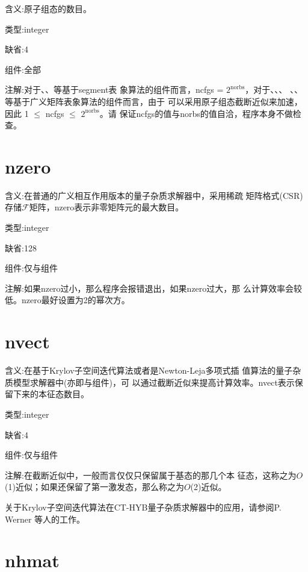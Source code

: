{\color{red}含义}:原子组态的数目。

{\color{green}类型}:integer

{\color{blue}缺省}:4

{\color{brown}组件}:全部

{\color{purple}注解}:对于{\azalea}、{\gardenia}、{\narcissus}等基于segment表
象算法的组件而言，ncfgs = $2^{\text{norbs}}$，对于{\begonia}、{\lavender}、{\camellia}、
{\epiphyllum}、{\pansy}、{\manjushaka}等基于广义矩阵表象算法的组件而言，由于
可以采用原子组态截断近似来加速，因此 1 $\leq$ ncfgs $\leq$  $2^{\text{norbs}}$。请
保证ncfgs的值与norbs的值自洽，程序本身不做检查。

\section{nzero }
\label{sec:nzero}

{\color{red}含义}:在普通的广义相互作用版本的量子杂质求解器中，采用稀疏
矩阵格式(CSR)存储$\mathcal{F}$矩阵，nzero表示非零矩阵元的最大数目。

{\color{green}类型}:integer

{\color{blue}缺省}:128

{\color{brown}组件}:仅{\begonia}与{\lavender}组件

{\color{purple}注解}:如果nzero过小，那么程序会报错退出，如果nzero过大，那
么计算效率会较低。nzero最好设置为2的幂次方。

\section{nvect }
\label{sec:nvect}

{\color{red}含义}:在基于Krylov子空间迭代算法或者是Newton-Leja多项式插
值算法的量子杂质模型求解器中(亦即{\camellia}与{\epiphyllum}组件)，可
以通过截断近似来提高计算效率。nvect表示保留下来的本征态数目。

{\color{green}类型}:integer

{\color{blue}缺省}:4

{\color{brown}组件}:仅{\camellia}与{\epiphyllum}组件

{\color{purple}注解}:在截断近似中，一般而言仅仅只保留属于基态的那几个本
征态，这称之为$O$(1)近似；如果还保留了第一激发态，那么称之为$O$(2)近似。

关于Krylov子空间迭代算法在CT-HYB量子杂质求解器中的应用，请参阅P. Werner
等人的工作\cite{lauchli:235117}。

\section{nhmat }
\label{sec:nhmat}

